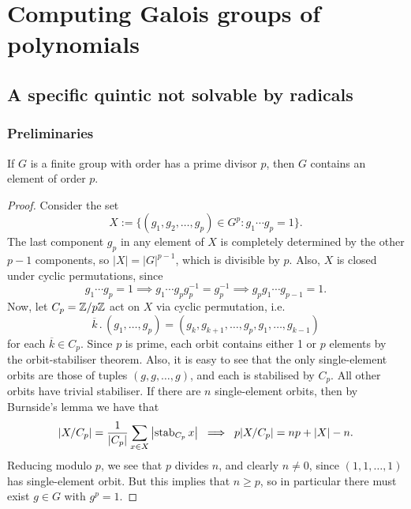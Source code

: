 \chapter{Computing Galois groups of polynomials}

\section{A specific quintic not solvable by radicals}

\subsection{Preliminaries}

\begin{theorem}[Cauchy]
    If $G$ is a finite group with order has a prime divisor $p$, then $G$ contains an element of order $p$.
\end{theorem}

\begin{proof}
    Consider the set
    \[
        X := \{(g_1, g_2, \ldots, g_p) \in G^p: g_1 \cdots g_p = 1\}.
    \]
    The last component $g_p$ in any element of $X$ is completely determined by the other $p - 1$ components, so $|X| = |G|^{p - 1}$, which is divisible by $p$. Also, $X$ is closed under cyclic permutations, since
    \[
        g_1 \cdots g_p = 1 \implies g_1 \cdots g_p g_p^{-1} = g_p^{-1} \implies g_p g_1 \cdots g_{p - 1} = 1.
    \]
    Now, let $C_p = \mathbb{{Z}}/{{p}}\mathbb{{Z}}$ act on $X$ via cyclic permutation, i.e.
    \[
        \overline{k} \, . \, (g_1, \ldots, g_p) = (g_k, g_{k + 1}, \ldots, g_p, g_1, \ldots, g_{k - 1})
    \]
    for each $\overline{k} \in C_p$. Since $p$ is prime, each orbit contains either 1 or $p$ elements by the orbit-stabiliser theorem. Also, it is easy to see that the only single-element orbits are those of tuples $(g, g, \ldots, g)$, and each is stabilised by $C_p$. All other orbits have trivial stabiliser. If there are $n$ single-element orbits, then by Burnside's lemma we have that
    \[
       |X/C_p| = \frac{1}{|C_p|} \sum_{x \in X} \left|\operatorname{stab}_{{C_p}}{{x}}\right| \; \implies \; p |X/C_p| = np + |X| - n.
    \]
    Reducing modulo $p$, we see that $p$ divides $n$, and clearly $n \neq 0$, since $(1, 1, \ldots, 1)$ has single-element orbit. But this implies that $n \geq p$, so in particular there must exist $g \in G$ with $g^p = 1$.
\end{proof}

